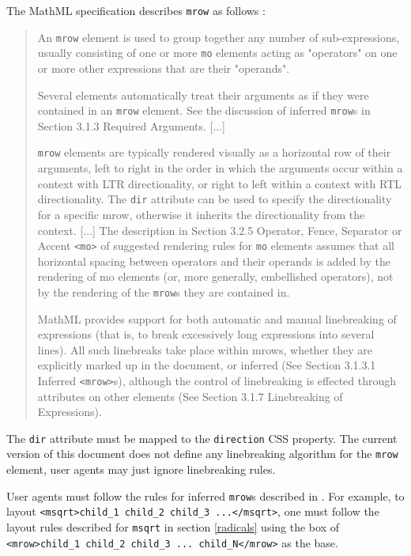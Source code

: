 The MathML specification describes {\tt mrow} as follows \cite{MathML3}:
%
\begin{quote}
  An {\tt mrow} element is used to group together any number of sub-expressions,
  usually consisting of one or more {\tt mo} elements acting as "operators" on
  one or more other expressions that are their "operands".

  Several elements automatically treat their arguments as if they were
  contained in an {\tt mrow} element. See the discussion of inferred {\tt mrow}s
  in Section 3.1.3 Required Arguments. [...]

  {\tt mrow} elements are typically rendered visually as a horizontal row of
  their arguments, left to right in the order in which the arguments occur
  within a context with LTR directionality, or right to left within a context
  with RTL directionality. The {\tt dir} attribute can be used to specify the
  directionality for a specific mrow, otherwise it inherits the directionality
  from the context. [...] The description in Section 3.2.5 Operator, Fence,
  Separator or Accent {\tt <mo>} of suggested rendering rules for {\tt mo}
  elements assumes that all horizontal spacing between operators and their
  operands is added by the rendering of mo elements (or, more generally,
  embellished operators), not by the rendering of the {\tt mrow}s they are
  contained in.

  MathML provides support for both automatic and manual linebreaking of
  expressions (that is, to break excessively long expressions into several
  lines). All such linebreaks take place within mrows, whether they are
  explicitly marked up in the document, or inferred (See Section 3.1.3.1
  Inferred {\tt <mrow>}s), although the control of linebreaking is effected
  through attributes on other elements (See Section 3.1.7 Linebreaking of
  Expressions).
\end{quote}

The {\tt dir} attribute must be mapped to the {\tt direction} CSS property.
The current version of this document does not define any linebreaking algorithm
for the {\tt mrow} element, user agents may just ignore linebreaking rules.

User agents must follow the rules for inferred {\tt mrow}s described in
\cite{MathML3}. For example, to layout
{\tt <msqrt>child\_1 child\_2 child\_3 ...</msqrt>}, one must follow the layout
rules described for {\tt msqrt} in section \ref{radicals} using
the box of {\tt <mrow>child\_1 child\_2 child\_3 ... child\_N</mrow>} as the base.

